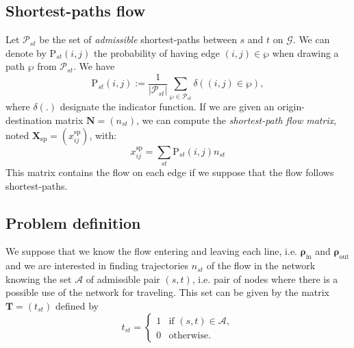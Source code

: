 \documentclass[11p]{article}
\begin{document}
\subsection{Shortest-paths flow}

Let $\mathcal{P}_{st}$ be the set of \emph{admissible} shortest-paths between $s$ and $t$ on $\mathcal{G}$. We can denote by $\text{P}_{st}(i, j)$ the probability of having edge $(i, j) \in \wp$ when drawing a path $\wp$ from $\mathcal{P}_{st}$. We have 
\begin{equation}
\text{P}_{st}(i, j) := \frac{1}{|\mathcal{P}_{st}|}\sum_{\wp \in \mathcal{P}_{st}} \delta((i, j) \in \wp),
\end{equation}
where $\delta(.)$ designate the indicator function. If we are given an origin-destination matrix $\mathbf{N} = (n_{st})$, we can compute the \emph{shortest-path flow matrix}, noted $\mathbf{X}_\text{sp} = (x^\text{sp}_{ij})$, with:
\begin{equation}
x^\text{sp}_{ij} = \sum_{st} \text{P}_{st}(i, j) n_{st} \label{sp_comp}
\end{equation}
This matrix contains the flow on each edge if we suppose that the flow follows shortest-paths.

\subsection{Problem definition}

We suppose that we know the flow entering and leaving each line, i.e. $\bm{\rho}_\text{in}$ and $\bm{\rho}_\text{out}$ and we are interested in finding trajectories $n_{st}$ of the flow in the network knowing the set $\mathcal{A}$ of admissible pair $(s, t)$, i.e. pair of nodes where there is a possible use of the network for traveling. This set can be given by the matrix $\mathbf{T} = (t_{st})$ defined by
\begin{equation}
t_{st} = \begin{cases}
1 & \text{if } (s, t) \in \mathcal{A}, \\
0 & \text{otherwise}.
\end{cases}
\end{equation}
\end{document}
